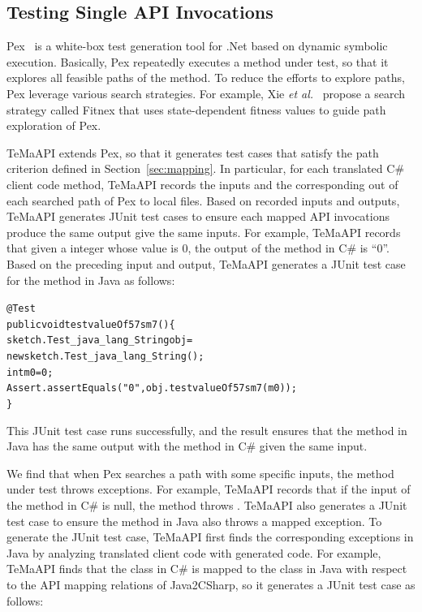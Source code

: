 \subsection{Testing Single API Invocations}
\label{sec:approach:single}

Pex~\cite{tillmann2008pex} is a white-box test generation tool for .Net based on dynamic symbolic execution. Basically, Pex repeatedly executes a method under test, so that it explores all feasible paths of the method. To reduce the efforts to explore paths, Pex leverage various search strategies. For example, Xie \emph{et al.}~\cite{xie09:fitness} propose a search strategy called Fitnex that uses state-dependent fitness values to guide path exploration of Pex. 

TeMaAPI extends Pex, so that it generates test cases that satisfy the path criterion defined in Section~\ref{sec:mapping}. In particular, for each translated C\# client code method, TeMaAPI records the inputs and the corresponding out of each searched path of Pex to local files. Based on recorded inputs and outputs, TeMaAPI generates JUnit test cases to ensure each mapped API invocations produce the same output give the same inputs.
For example, TeMaAPI records that given a integer whose value is 0, the output of the  method in C\# is ``0''. Based on the preceding input and output, TeMaAPI generates a JUnit test case for the  method in Java as follows:

\begin{CodeOut}%
\begin{alltt}
@Test
public void testvalueOf57sm7()\{
  sketch.Test_java_lang_String obj =
      new sketch.Test_java_lang_String();
  int m0 = 0;
  Assert.assertEquals("0", obj.testvalueOf57sm7(m0));
\}
\end{alltt}
\end{CodeOut}

This JUnit test case runs successfully, and the result ensures that the  method in Java has the same output with the  method in C\# given the same input.


We find that when Pex searches a path with some specific inputs, the method under test throws exceptions.
For example, TeMaAPI records that if the input of the  method in C\# is null, the method throws . TeMaAPI also generates a JUnit test case to ensure the  method in Java also throws a mapped exception. To generate the JUnit test case, TeMaAPI first finds the corresponding exceptions in Java by analyzing translated client code with generated code. For example, TeMaAPI finds that the  class in C\# is mapped to the  class in Java with respect to the API mapping relations of Java2CSharp, so it generates a JUnit test case as follows:

